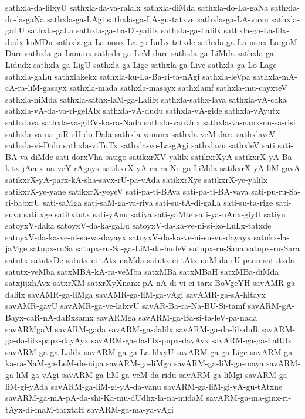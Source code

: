 {sathxla-da-lilxyU
sathxla-da-va-ralalx
sathxla-diMda
sathxla-do-La-gaNa
sathxla-do-la-gaNa
sathxla-ga-LAgi
sathxla-ga-LA-gu-tatxve
sathxla-ga-LA-vuvu
sathxla-gaLU
sathxla-gaLa
sathxla-ga-La-Di-yalilx
sathxla-ga-Lalilx
sathxla-ga-La-lilx-dudx-koMDu
sathxla-ga-La-nonx-La-go-LuLx-tatxde
sathxla-ga-La-nonx-La-goM-Dare
sathxla-ga-Lanunx
sathxla-ga-LeM-dare
sathxla-ga-LiMda
sathxla-ga-Lidudx
sathxla-ga-LigU
sathxla-ga-Lige
sathxla-ga-Live
sathxla-ga-Lo-Lage
sathxla-gaLu
sathxlakekx
sathxla-ku-La-Ba-ri-ta-nAgi
sathxla-leVpa
sathxla-mA-cA-ra-liM-gasayx
sathxla-mada
sathxla-masayx
sathxlamf
sathxla-mu-cayxteV
sathxla-niMda
sathxla-sathx-laM-ga-Lalilx
sathxla-sathx-lava
sathxla-vA-caka
sathxla-vA-da-va-ri-gelAlx
sathxla-vA-dudu
sathxla-vA-gide
sathxla-vAyutx
sathxlava
sathxla-va-giRV-ka-ra-Nada
sathxla-vanUnx
sathxla-va-nanx-nu-sa-risi
sathxla-va-na-piR-sU-do-Dala
sathxla-vanunx
sathxla-veM-dare
sathxlaveV
sathxla-vi-Dalu
sathxla-viTuTx
sathxla-vo-La-gAgi
sathxlavu
sathxleV
sati
sati-BA-va-diMde
sati-dorxVha
satigo
satikxrXV-yalilx
satikxrXyA
satikxrX-yA-Ba-kitx-jAcnx-na-veY-rAgayx
satikxrX-yA-ca-ra-Ne-ga-LiMda
satikxrX-yA-liM-gavA
satikxrX-yA-parx-kA-sha-savx-rU-pa-vAda
satikxrXye
satikxrX-ye-yalilx
satikxrX-ye-yane
satikxrX-yeyeV
sati-pa-ti-BAva
sati-pa-ti-BA-vava
sati-pu-ru-Sa-ri-babxrU
sati-saMga
sati-saM-ga-va-riya
sati-su-tA-di-gaLa
sati-su-ta-rige
sati-suva
satitxge
satitxtutx
sati-yAnu
satiya
sati-yaMte
sati-ya-nAnx-giyU
satiyu
satoyxV-daka
satoyxV-da-ka-gaLu
satoyxV-da-ka-ve-ni-si-ko-LuLx-tatxde
satoyxV-da-ka-ve-ni-su-va-dayayx
satoyxV-da-ka-ve-ni-su-vu-dayayx
satukx-la-jaMge
satupx-ruSa
satupx-ru-Sa-ga-LiM-da-hudeV
satupx-ru-Sana
satupx-ru-Sara
satutx
satutxDe
satutx-ci-tAtx-naMda
satutx-ci-tAtx-naM-da-rU-panu
satutxda
satutx-veMba
satxMBA-kA-ra-veMba
satxMBa
satxMBaH
satxMBa-diMda
satxjijxhAvx
satxrXM
satxrXyXnanx-pA-nA-di-vi-ci-tarx-BoVgeYH
savAMR-ga-dalilx
savAMR-ga-liMga
savAMR-ga-liM-ga-vAgi
savAMR-ga-sA-hitayx
savAMR-gavU
savAMR-ga-ve-lalxvU
savAR-Ba-ra-Na-BU-Si-tamf
savARM-gA-Bayx-caR-nA-daBxsamx
savARMga
savARM-ga-Ba-si-ta-leV-pa-nada
savARMgaM
savARM-gada
savARM-ga-dalilx
savARM-ga-da-lilxduR
savARM-ga-da-lilx-papx-dayAyx
savARM-ga-da-lilx-pupx-dayAyx
savARM-ga-ga-LalUlx
savARM-ga-ga-Lalilx
savARM-ga-ga-La-lilxyU
savARM-ga-ga-Lige
savARM-ga-ka-ra-NaM-ga-LeM-de-nipa
savARM-ga-liMga
savARM-ga-liM-ga-maya
savARM-ga-liM-ga-vAgi
savARM-ga-liM-ga-veM-da-ridu
savARM-ga-liMgi
savARM-ga-liM-gi-yAda
savARM-ga-liM-gi-yA-da-vanu
savARM-ga-liM-gi-yA-gu-tAtxne
savARM-ga-mA-pA-da-shi-Ka-mu-dUdhx-la-na-midaM
savARM-ga-ma-ginx-ri-tAyx-di-maM-tarxtaH
savARM-ga-ma-ya-vAgi
}
